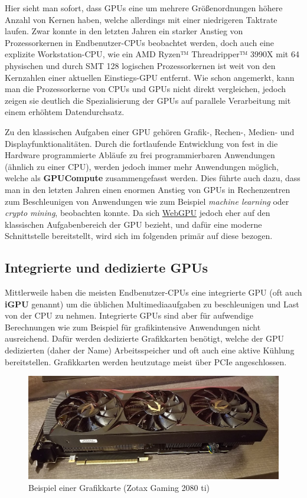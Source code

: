 \documentclass[oneside]{ausarbeitung}
\begin{document}
Hier sieht man sofort, dass \ac{GPU}s eine um mehrere Größenordnungen höhere Anzahl von Kernen haben, welche allerdings mit einer niedrigeren Taktrate laufen. Zwar konnte in den letzten Jahren ein starker Anstieg von Prozessorkernen in Endbenutzer-\ac{CPU}s beobachtet werden, doch auch eine explizite Workstation-\ac{CPU}, wie ein AMD Ryzen™ Threadripper™ 3990X \cite{amd:threadripper_3990x} mit 64 physischen und durch \ac{SMT} 128 logischen Prozessorkernen ist weit von den Kernzahlen einer aktuellen Einstiegs-\ac{GPU} entfernt. Wie schon angemerkt, kann man die Prozessorkerne von \ac{CPU}s und \ac{GPU}s nicht direkt vergleichen, jedoch zeigen sie deutlich die Spezialisierung der \ac{GPU}s auf parallele Verarbeitung mit einem erhöhtem Datendurchsatz. 

Zu den klassischen Aufgaben einer \ac{GPU} gehören Grafik-, Rechen-, Medien- und Displayfunktionalitäten. Durch die fortlaufende Entwicklung von fest in die Hardware programmierte Abläufe zu frei programmierbaren Anwendungen (ähnlich zu einer \ac{CPU}), werden jedoch immer mehr Anwendungen möglich, welche als \textbf{GPUCompute} zusammengefasst werden. Dies führte auch dazu, dass man in den letzten Jahren einen enormen Anstieg von \ac{GPU}s in Rechenzentren zum Beschleunigen von Anwendungen wie zum Beispiel \textit{machine learning} oder \textit{crypto mining}, beobachten konnte. Da sich \hyperref[cha:webgpu]{WebGPU} jedoch eher auf den klassischen Aufgabenbereich der \ac{GPU} bezieht, und dafür eine moderne Schnittstelle bereitstellt, wird sich im folgenden primär auf diese bezogen.

\subsection{Integrierte und dedizierte GPUs}
\label{sub:GPU_dedicated_integrated}
Mittlerweile haben die meisten Endbenutzer-\ac{CPU}s eine integrierte \ac{GPU} (oft auch \textbf{iGPU} genannt) um die üblichen Multimediaaufgaben zu beschleunigen und Last von der \ac{CPU} zu nehmen. Integrierte \ac{GPU}s sind aber für aufwendige Berechnungen wie zum Beispiel für grafikintensive Anwendungen nicht ausreichend. Dafür werden dedizierte Grafikkarten benötigt, welche der \ac{GPU} dedizierten (daher der Name) Arbeitsspeicher und oft auch eine aktive Kühlung bereitstellen. Grafikkarten werden heutzutage meist über \ac{PCIe} angeschlossen.

\begin{figure}
    \includegraphics[width=\textwidth]{images/1024px-Zotac_Gaming_GTX_2080_ti.jpg}
    \caption{Beispiel einer Grafikkarte (Zotax Gaming 2080 ti) \cite{2080_ti_graphics_card}}
    \label{fig:2080_ti_graphics_card}
\end{figure}
\end{document}
